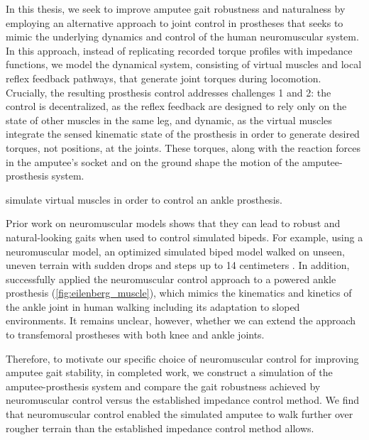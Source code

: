 In this thesis, we seek to improve amputee gait robustness and naturalness by
employing an alternative approach to joint control in prostheses that seeks to
mimic the underlying dynamics and control of the human neuromuscular system. In
this approach, instead of replicating recorded torque profiles with impedance
functions, we model the dynamical system, consisting of virtual muscles and
local reflex feedback pathways, that generate joint torques during locomotion.
Crucially, the resulting prosthesis control addresses challenges 1 and 2: the
control is decentralized, as the reflex feedback are designed to rely only on
the state of other muscles in the same leg, and dynamic, as the virtual muscles
integrate the sensed kinematic state of the prosthesis in order to generate
desired torques, not positions, at the joints. These torques, along with the
reaction forces in the amputee's socket and on the ground shape the motion of
the amputee-prosthesis system.
\begin{marginfigure}
    \centering
    \caption{\citet{eilenberg2010control} simulate virtual muscles in
    order to control an ankle prosthesis.}
    \label{fig:eilenberg_muscle}
\end{marginfigure}

Prior work on neuromuscular models shows that they can lead to robust and
natural-looking gaits when used to control simulated bipeds. For example, using
a neuromuscular model, an optimized simulated biped model walked on unseen,
uneven terrain with sudden drops and steps up to 14 centimeters
\citep{song2015neural}. In addition, \citet{eilenberg2010control} successfully
applied the neuromuscular control approach to a powered ankle prosthesis
(\cref{fig:eilenberg_muscle}), which mimics the kinematics and kinetics of the
ankle joint in human walking including its adaptation to sloped environments. It
remains unclear, however, whether we can extend the approach to transfemoral
prostheses with both knee and ankle joints.

Therefore, to motivate our specific choice of neuromuscular control for
improving amputee gait stability, in completed work, we construct a simulation
of the amputee-prosthesis system and compare the gait robustness achieved by
neuromuscular control versus the established impedance control method. We find
that neuromuscular control enabled the simulated amputee to walk further over
rougher terrain than the established impedance control method allows.

